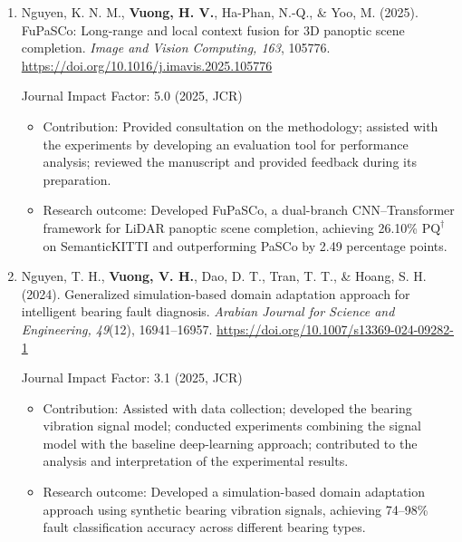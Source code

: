 \documentclass[a4paper,12pt]{article}
\begin{document}
\begin{enumerate}[
    leftmargin=*,
    labelsep=0.5em,
    align=left
]
  \item
  Nguyen, K. N. M., \textbf{Vuong, H. V.}, Ha-Phan, N.-Q., \& Yoo, M. (2025).
  FuPaSCo: Long-range and local context fusion for 3D panoptic scene completion.
  \textit{Image and Vision Computing, 163}, 105776.
  \href{https://doi.org/10.1016/j.imavis.2025.105776}
  {https://doi.org/10.1016/j.imavis.2025.105776}

  Journal Impact Factor: 5.0 (2025, JCR)

\begin{itemize}[leftmargin=1.5em]

    \item Contribution: Provided consultation on the methodology; assisted with the experiments by developing an evaluation tool for performance analysis; reviewed the manuscript and provided feedback during its preparation.
    \item Research outcome: Developed FuPaSCo, a dual-branch
    CNN--Transformer framework for LiDAR panoptic scene completion,
    achieving 26.10\% $\mathrm{PQ}^\dagger$ on SemanticKITTI and
    outperforming PaSCo by 2.49 percentage points.

\end{itemize}

  \item
  Nguyen, T. H., \textbf{Vuong, V. H.}, Dao, D. T., Tran, T. T., \& Hoang, S. H. (2024).
  Generalized simulation-based domain adaptation approach for intelligent bearing fault diagnosis.
  \textit{Arabian Journal for Science and Engineering, 49}(12), 16941--16957.
  \href{https://doi.org/10.1007/s13369-024-09282-1}
  {https://doi.org/10.1007/s13369-024-09282-1}

  Journal Impact Factor: 3.1 (2025, JCR)

\begin{itemize}[leftmargin=1.5em]

    \item Contribution: Assisted with data collection; developed the
    bearing vibration signal model; conducted experiments combining the signal model with the baseline deep-learning approach; contributed to the analysis and interpretation of the experimental results.
    \item Research outcome: Developed a simulation-based domain adaptation
    approach using synthetic bearing vibration signals, achieving
    74--98\% fault classification accuracy across different bearing types.

\end{itemize}

\end{enumerate}
\end{document}
